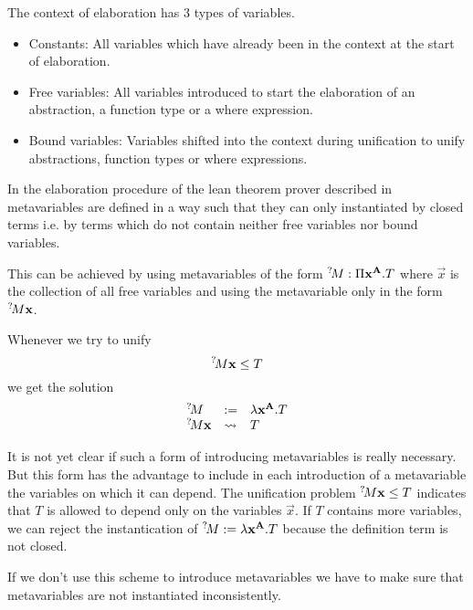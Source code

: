 The context of elaboration has 3 types of variables.

\begin{itemize}

\item Constants: All variables which have already been in the context at the
start of elaboration.

\item Free variables: All variables introduced to start the elaboration of an
abstraction, a function type or a where expression.

\item Bound variables: Variables shifted into the context during unification to
unify abstractions, function types or where expressions.

\end{itemize}

In the elaboration procedure of the lean theorem prover described in
\cite{demoura2015} metavariables are defined in a way such that they can only
instantiated by closed terms i.e. by terms which do not contain neither free
variables nor bound variables.

This can be achieved by using metavariables of the form ${}^?\!M: \Pi
\mathbf{x}^{\mathbf{A}}.T$ where $\vec{x}$ is the collection of all free variables and
using the metavariable only in the form ${}^?\!M \mathbf{x}$.

Whenever we try to unify
$$
    \meta{M} \vec{x} \le T
$$
we get the solution
$$
\begin{array}{lll}
    \meta{M} &:=& \lambda \vec{x}^{\vec{A}}. T

    \\

    \meta{M} \vec{x} &\leadsto& T
\end{array}
$$

It is not yet clear if such a form of introducing metavariables is really
necessary. But this form has the advantage to include in each introduction of a
metavariable the variables on which it can depend. The unification problem
${}^?\!M \mathbf{x} \le T$ indicates that $T$ is allowed to depend only on the
variables $\vec{x}$. If $T$ contains more variables, we can reject the
instantication of ${}^?\!M := \lambda \mathbf{x}^{\mathbf{A}}. T$ because the
definition term is not closed.

If we don't use this scheme to introduce metavariables we have to make sure that
metavariables are not instantiated inconsistently.




